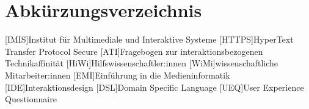 
\cleardoublepage
{}
\chapter*{Abkürzungsverzeichnis}
\label{section-abbrevs}

\begin{acronym}[Companion]
  [IMIS]{Institut für Multimediale und Interaktive Systeme}
  [HTTPS]{HyperText Transfer Protocol Secure}
  [ATI]{Fragebogen zur interaktionsbezogenen Technikaffinität}
  [HiWi]{Hilfswissenschaftler:innen}
  [WiMi]{wissenschaftliche Mitarbeiter:innen}
  [EMI]{Einführung in die Medieninformatik}
  [IDE]{Interaktionsdesign}
  [DSL]{Domain Specific Language}
  [UEQ]{User Experience Questionnaire}  
\end{acronym}
